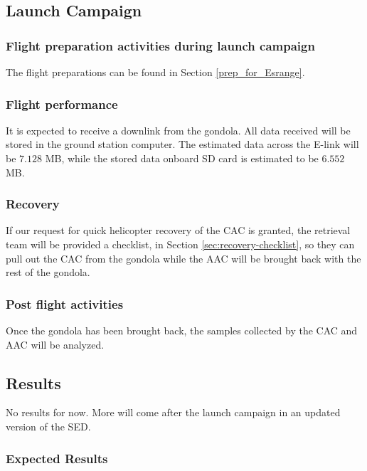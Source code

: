 \documentclass[a4paper,12pt,oneside]{article} %
\providecommand{\DIFdelbegin}{} %
\newcommand{\DIFscaledelfig}{0.5}
\newlength{\DIFdelgraphicswidth} %
\newlength{\DIFdelgraphicsheight} %
\newcommand{\DIFdelincludegraphics}[2][]{%
\sbox{\DIFdelgraphicsbox}{\DIFOincludegraphics[#1]{#2}}%
\settoboxwidth{\DIFdelgraphicswidth}{\DIFdelgraphicsbox} %
\settoboxtotalheight{\DIFdelgraphicsheight}{\DIFdelgraphicsbox} %
\scalebox{\DIFscaledelfig}{%
\parbox[b]{\DIFdelgraphicswidth}{\usebox{\DIFdelgraphicsbox}\\[-\baselineskip] \rule{\DIFdelgraphicswidth}{0em}}\llap{\resizebox{\DIFdelgraphicswidth}{\DIFdelgraphicsheight}{%
\setlength{\unitlength}{\DIFdelgraphicswidth}%
\begin{picture}(1,1)%
\thicklines\linethickness{2pt} %
{\color[rgb]{1,0,0}\put(0,0){\framebox(1,1){}}}%
{\color[rgb]{1,0,0}\put(0,0){\line( 1,1){1}}}%
{\color[rgb]{1,0,0}\put(0,1){\line(1,-1){1}}}%
\end{picture}%
}\hspace*{3pt}}} %
} %
\DeclareRobustCommand{\DIFdelbegin}{\DIFOdelbegin \let\includegraphics\DIFdelincludegraphics} %
\begin{document}
\pagebreak
\subsection{Launch Campaign}
\subsubsection{Flight preparation activities during launch campaign} %
The flight preparations can be found in Section \ref{prep_for_Esrange}.

\subsubsection{Flight performance}
It is expected to receive a downlink from the gondola. All data received will be stored in the ground station computer. The estimated data across the E-link will be $7.128$ MB, while the stored data onboard SD card is estimated to be $6.552$ MB.

\subsubsection{Recovery}
If our request for quick helicopter recovery of the CAC is granted, the retrieval team will be provided a checklist, in Section \ref{sec:recovery-checklist}, so they can pull out the CAC from the gondola while the AAC will be brought back with the rest of the gondola.

\subsubsection{Post flight activities}
Once the gondola has been brought back, the samples collected by the CAC and AAC will be analyzed.

\subsection{Results}

No results for now. More will come after the launch campaign in an updated version of the SED. 

\subsubsection{Expected Results}
\DIFdelbegin %
\end{document}
